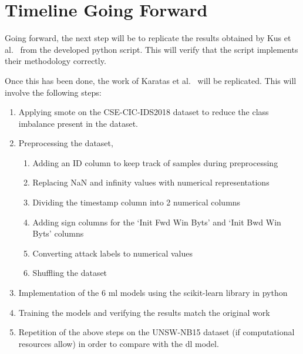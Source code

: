 \chapter{Timeline Going Forward}%
\label{chp:timeline}

Going forward, the next step will be to replicate the results obtained by Kus
et al.~\cite{Kus} from the developed python script. This will verify that the script
implements their methodology correctly.

Once this has been done, the work of Karatas et al.~\cite{Karatas} will be replicated. This
will involve the following steps:
\begin{enumerate}
      \item Applying \gls{smote} on the CSE-CIC-IDS2018 dataset to reduce the class
            imbalance present in the dataset.
      \item Preprocessing the dataset,
            \begin{enumerate}
                  \item Adding an ID column to keep track of samples during preprocessing
                  \item Replacing NaN and infinity values with numerical representations
                  \item Dividing the timestamp column into 2 numerical columns
                  \item Adding sign columns for the `Init Fwd Win Byts' and `Init Bwd Win Byts' columns
                  \item Converting attack labels to numerical values
                  \item Shuffling the dataset
            \end{enumerate}
      \item Implementation of the 6 \gls{ml} models using the scikit-learn library in
            python
      \item Training the models and verifying the results match the original work
      \item Repetition of the above steps on the UNSW-NB15 dataset (if computational
            resources allow) in order to compare with the \gls{dl} model.
\end{enumerate}

